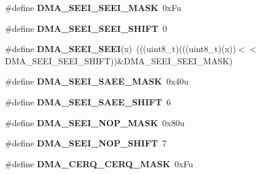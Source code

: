 \begin{DoxyCompactItemize}
\item 
\#define {\bfseries D\+M\+A\+\_\+\+S\+E\+E\+I\+\_\+\+S\+E\+E\+I\+\_\+\+M\+A\+SK}~0x\+Fu\hypertarget{group__DMA__Register__Masks_ga67059eac1eff574cd4934a35a0476015}{}\label{group__DMA__Register__Masks_ga67059eac1eff574cd4934a35a0476015}

\item 
\#define {\bfseries D\+M\+A\+\_\+\+S\+E\+E\+I\+\_\+\+S\+E\+E\+I\+\_\+\+S\+H\+I\+FT}~0\hypertarget{group__DMA__Register__Masks_ga8d58d06faafb79d99b17b5694f3d18e5}{}\label{group__DMA__Register__Masks_ga8d58d06faafb79d99b17b5694f3d18e5}

\item 
\#define {\bfseries D\+M\+A\+\_\+\+S\+E\+E\+I\+\_\+\+S\+E\+EI}(x)~(((uint8\+\_\+t)(((uint8\+\_\+t)(x))$<$$<$D\+M\+A\+\_\+\+S\+E\+E\+I\+\_\+\+S\+E\+E\+I\+\_\+\+S\+H\+I\+FT))\&D\+M\+A\+\_\+\+S\+E\+E\+I\+\_\+\+S\+E\+E\+I\+\_\+\+M\+A\+SK)\hypertarget{group__DMA__Register__Masks_ga5e1057a8a3c0471a410d748cd532cce3}{}\label{group__DMA__Register__Masks_ga5e1057a8a3c0471a410d748cd532cce3}

\item 
\#define {\bfseries D\+M\+A\+\_\+\+S\+E\+E\+I\+\_\+\+S\+A\+E\+E\+\_\+\+M\+A\+SK}~0x40u\hypertarget{group__DMA__Register__Masks_ga2d0a03f5b7e54876cc8a0af2251b1809}{}\label{group__DMA__Register__Masks_ga2d0a03f5b7e54876cc8a0af2251b1809}

\item 
\#define {\bfseries D\+M\+A\+\_\+\+S\+E\+E\+I\+\_\+\+S\+A\+E\+E\+\_\+\+S\+H\+I\+FT}~6\hypertarget{group__DMA__Register__Masks_ga313d9b0f41aebf4cc2f6a5f1f730665b}{}\label{group__DMA__Register__Masks_ga313d9b0f41aebf4cc2f6a5f1f730665b}

\item 
\#define {\bfseries D\+M\+A\+\_\+\+S\+E\+E\+I\+\_\+\+N\+O\+P\+\_\+\+M\+A\+SK}~0x80u\hypertarget{group__DMA__Register__Masks_ga4561a1738dbf8013bd619fad65b0e216}{}\label{group__DMA__Register__Masks_ga4561a1738dbf8013bd619fad65b0e216}

\item 
\#define {\bfseries D\+M\+A\+\_\+\+S\+E\+E\+I\+\_\+\+N\+O\+P\+\_\+\+S\+H\+I\+FT}~7\hypertarget{group__DMA__Register__Masks_ga190051f9e53699e081f1b6f96f6890c8}{}\label{group__DMA__Register__Masks_ga190051f9e53699e081f1b6f96f6890c8}

\item 
\#define {\bfseries D\+M\+A\+\_\+\+C\+E\+R\+Q\+\_\+\+C\+E\+R\+Q\+\_\+\+M\+A\+SK}~0x\+Fu\hypertarget{group__DMA__Register__Masks_ga6c4e980f82778e0191670788d29dcb9e}{}\label{group__DMA__Register__Masks_ga6c4e980f82778e0191670788d29dcb9e}


\end{DoxyCompactItemize}
